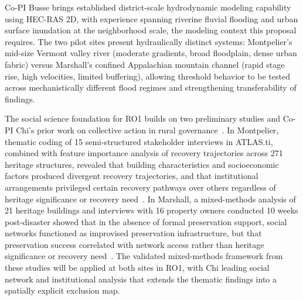 \documentclass[11pt]{article}
\begin{document}
Co-PI Busse brings established district-scale hydrodynamic modeling capability using
HEC-RAS 2D, with experience spanning riverine fluvial flooding and urban surface
inundation at the neighborhood scale, the modeling context this proposal requires.
The two pilot sites present hydraulically distinct systems: Montpelier's mid-size
Vermont valley river (moderate gradients, broad floodplain, dense urban fabric) versus
Marshall's confined Appalachian mountain channel (rapid stage rise, high velocities,
limited buffering), allowing threshold behavior to be tested across mechanistically
different flood regimes and strengthening transferability of findings.


The social science foundation for RO1 builds on two preliminary studies and
Co-PI Chi's prior work on collective action in rural governance~\cite{li2023collective}.
In Montpelier, thematic coding \cite{boyatzis1998transforming} of 15 semi-structured stakeholder interviews in
ATLAS.ti, combined with feature importance analysis of recovery trajectories across
271 heritage structures, revealed that building characteristics and socioeconomic
factors produced divergent recovery trajectories, and that institutional arrangements
privileged certain recovery pathways over others regardless of heritage significance
or recovery need~\cite{maalouf2025a}.
In Marshall, a mixed-methods analysis of 21 heritage buildings and interviews with
16 property owners conducted 10 weeks post-disaster showed that in the absence of
formal preservation support, social networks functioned as improvised preservation
infrastructure, but that preservation success correlated with network access rather
than heritage significance or recovery need~\cite{maalouf2025b}.
The validated mixed-methods framework from these studies will be applied at both
sites in RO1, with Chi leading social network and institutional analysis that
extends the thematic findings into a spatially explicit exclusion map.
\vspace{-0.4cm}
\end{document}
